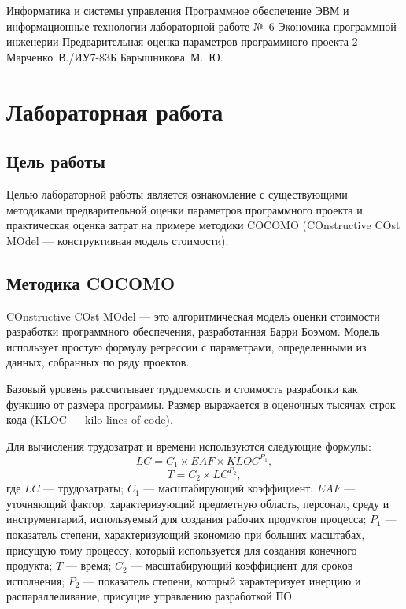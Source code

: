 \documentclass{bmstu}
\begin{document}
\makereporttitle
    {Информатика и системы управления}
    {Программное обеспечение ЭВМ и информационные технологии}
    {лабораторной работе №~6}
    {Экономика программной инженерии}
    {Предварительная оценка параметров программного проекта}
    {2}
    {Марченко~В./ИУ7-83Б}
    {Барышникова~М.~Ю.}

{\centering \maketableofcontents}

\chapter{Лабораторная работа}

\section{Цель работы}

Целью лабораторной работы является ознакомление с существующими методиками предварительной оценки параметров программного проекта и практическая оценка затрат на примере методики COCOMO (COnstructive COst MOdel --- конструктивная модель стоимости).

\section{Методика COCOMO}

COnstructive COst MOdel --- это алгоритмическая модель оценки стоимости разработки программного обеспечения, разработанная Барри Боэмом. 
Модель использует простую формулу регрессии с параметрами, определенными из данных, собранных по ряду проектов.

Базовый уровень рассчитывает трудоемкость и стоимость разработки как функцию от размера программы. Размер выражается в оценочных тысячах строк кода (KLOC --- kilo lines of code).

Для вычисления трудозатрат и времени используются следующие формулы:
\begin{equation}
LC = C_1 \times EAF \times KLOC^{P_1}, 
\end{equation}
\begin{equation}
T = C_2 \times LC^{P_2}, 
\end{equation}
где $LC$ --- трудозатраты; $C_1$ --- масштабирующий коэффициент; $EAF$ --- уточняющий фактор, характеризующий предметную область, персонал, среду и инструментарий, используемый для создания рабочих продуктов процесса; $P_1$ --- показатель степени, характеризующий экономию при больших масштабах, присущую тому процессу, который используется для создания конечного продукта; $T$ --- время; $C_2$ --- масштабирующий коэффициент для сроков исполнения; $P_2$ --- показатель степени, который характеризует инерцию и распараллеливание, присущие управлению разработкой ПО.
\end{document}
